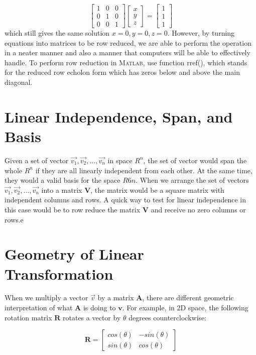 \documentclass[11pt]{article}
\begin{document}
\[
\begin{bmatrix}
    1 & 0 & 0 \\
    0 & 1 & 0 \\
    0 & 0 & 1 
\end{bmatrix}
\begin{bmatrix}
    x\\y\\z
\end{bmatrix}
=
\begin{bmatrix}
    1\\1\\1
\end{bmatrix}
\]
which still gives the same solution $x = 0, y = 0, z = 0$. However, by turning equations into matrices to be row reduced, we are able to perform the operation in a neater manner and also a manner that computers will be able to effectively handle. To perform row reduction in \textsc{Matlab}, use function rref(), which stands for the reduced row echolon form which has zeros below and above the main diagonal.

\section{Linear Independence, Span, and Basis}
Given a set of vector $\vec{v_1}, \vec{v_2}, \dots, \vec{v_n}$ in space $R^n$, the set of vector would span the whole $R^n$ if they are all linearly independent from each other. At the same time, they would a valid basis for the space $R6n$. When we arrange the set of vectors $\vec{v_1}, \vec{v_2}, \dots, \vec{v_n}$ into a matrix $\textbf{V}$, the matrix would be a square matrix with independent columns and rows. A quick way to test for linear independence in this case would be to row reduce the matrix $\textbf{V}$ and receive no zero columns or rows.e 


\section{Geometry of Linear Transformation}
When we multiply a vector $\vec{v}$ by a matrix $\textbf{A}$, there are different geometric interpretation of what $\textbf{A}$ is doing to $\textbf{v}$. For example, in 2D space, the following rotation matrix $\textbf{R}$ rotates a vector by $\theta$ degrees counterclockwise:

\[
\textbf{R}
=
\begin{bmatrix}
    cos(\theta) & -sin(\theta)\\
    sin(\theta) & cos(\theta)
\end{bmatrix}
\]
\end{document}
